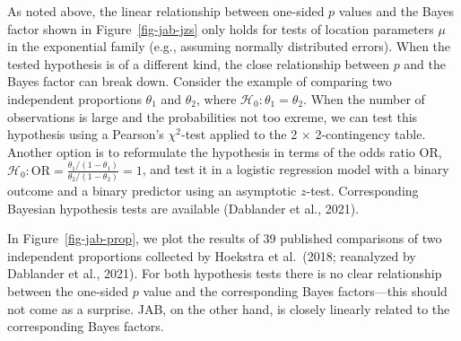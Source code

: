 \documentclass[
  man,
  floatsintext,
  longtable,
  nolmodern,
  notxfonts,
  notimes,
  colorlinks=true,linkcolor=blue,citecolor=blue,urlcolor=blue]{apa7}
\begin{document}
As noted above, the linear relationship between one-sided \(p\) values
and the Bayes factor shown in Figure~\ref{fig-jab-jzs} only holds for
tests of location parameters \(\mu\) in the exponential family (e.g.,
assuming normally distributed errors). When the tested hypothesis is of
a different kind, the close relationship between \(p\) and the Bayes
factor can break down. Consider the example of comparing two independent
proportions \(\theta_1\) and \(\theta_2\), where
\(\mathcal{H}_0: \theta_1 = \theta_2\). When the number of observations
is large and the probabilities not too exreme, we can test this
hypothesis using a Pearson's \(\chi^2\)-test applied to the 2 \(\times\)
2-contingency table. Another option is to reformulate the hypothesis in
terms of the odds ratio \(\text{OR}\),
\(\mathcal{H}_0: \text{OR} = \frac{\theta_1/(1-\theta_1)}{\theta_2/(1-\theta_2)} = 1\),
and test it in a logistic regression model with a binary outcome and a
binary predictor using an asymptotic \(z\)-test. Corresponding Bayesian
hypothesis tests are available (Dablander et al., 2021).

In Figure~\ref{fig-jab-prop}, we plot the results of 39 published
comparisons of two independent proportions collected by Hoekstra et
al.~(2018; reanalyzed by Dablander et al., 2021). For both hypothesis
tests there is no clear relationship between the one-sided \(p\) value
and the corresponding Bayes factors---this should not come as a
surprise. JAB, on the other hand, is closely linearly related to the
corresponding Bayes factors.
\end{document}
